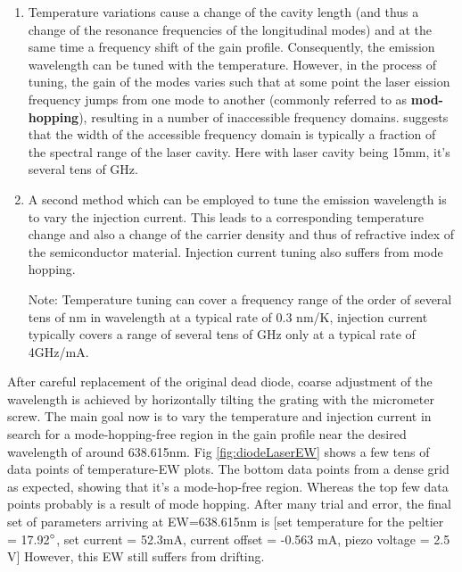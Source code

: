 \documentclass[12pt,A4Paper]{article}
\begin{document}
\begin{enumerate}
    \item Temperature variations cause a change of the cavity length (and thus a change of the resonance frequencies of the longitudinal modes) and at the same time a frequency shift of the gain profile. Consequently, the emission wavelength can be tuned with the temperature. However, in the process of tuning, the gain of the modes varies such that at some point the laser eission frequency jumps from one mode to another (commonly referred to as \textbf{mod-hopping}), resulting in a number of inaccessible frequency domains. \cite{compactGratingDiodeLaser} suggests that the width of the accessible frequency domain is typically a fraction of the spectral range of the laser cavity. Here with laser cavity being 15mm, it's several tens of GHz.

    \item A second method which can be employed to tune the emission wavelength is to vary the injection current. This leads to a corresponding temperature change and also a change of the carrier density and thus of refractive index of the semiconductor material. Injection current tuning also suffers from mode hopping. 
    \par
    Note: Temperature tuning can cover a frequency range of the order of several tens of nm in wavelength at a typical rate of 0.3 nm/K, injection current typically covers a range of several tens of GHz only at a typical rate of 4GHz/mA. 
\end{enumerate}
 
After careful replacement of the original dead diode, coarse adjustment of the wavelength is achieved by horizontally tilting the grating with the micrometer screw. The main goal now is to vary the temperature and injection current in search for a mode-hopping-free region in the gain profile near the desired wavelength of around 638.615nm. Fig \ref{fig:diodeLaserEW} shows a few tens of data points of temperature-EW plots. The bottom data points from a dense grid as expected, showing that it's a mode-hop-free region. Whereas the top few data points probably is a result of mode hopping. After many trial and error, the final set of parameters arriving at EW=638.615nm is [set temperature for the peltier = 17.92$\degree$, set current = 52.3mA, current offset = -0.563 mA, piezo voltage = 2.5 V] However, this EW still suffers from drifting. 
\end{document}
